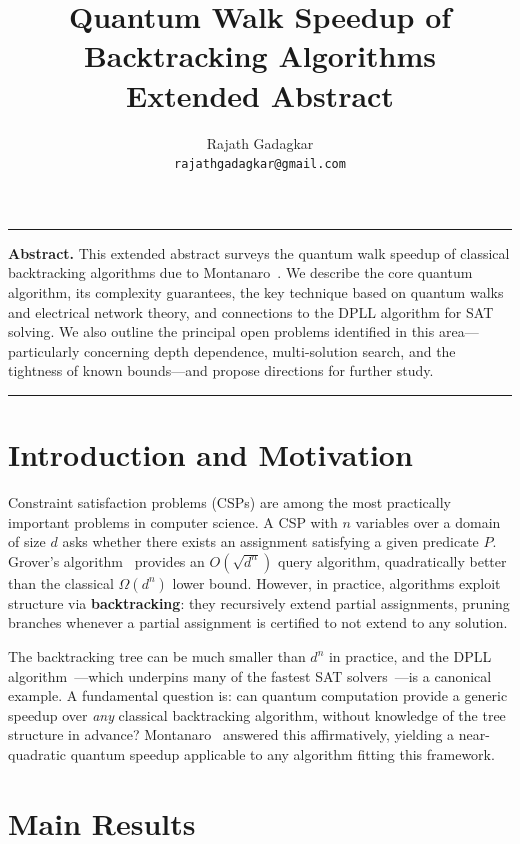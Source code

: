 \documentclass[11pt,a4paper]{article}
\title{\textbf{Quantum Walk Speedup of Backtracking Algorithms}\\[0.3em]
\large Extended Abstract}
\author{Rajath Gadagkar\\\texttt{rajathgadagkar@gmail.com}}
\date{}
\begin{document}
\maketitle
\vspace{-1em}
\hrule
\vspace{0.8em}

\noindent\textbf{Abstract.} This extended abstract surveys the quantum walk speedup of classical backtracking algorithms due to Montanaro~\cite{montanaro2015}. We describe the core quantum algorithm, its complexity guarantees, the key technique based on quantum walks and electrical network theory, and connections to the DPLL algorithm for SAT solving. We also outline the principal open problems identified in this area---particularly concerning depth dependence, multi-solution search, and the tightness of known bounds---and propose directions for further study.

\vspace{0.5em}
\hrule

\section{Introduction and Motivation}

Constraint satisfaction problems (CSPs) are among the most practically important problems in computer science. A CSP with $n$ variables over a domain of size $d$ asks whether there exists an assignment satisfying a given predicate $P$. Grover's algorithm~\cite{grover1997} provides an $O(\sqrt{d^n})$ query algorithm, quadratically better than the classical $\Omega(d^n)$ lower bound. However, in practice, algorithms exploit structure via \textbf{backtracking}: they recursively extend partial assignments, pruning branches whenever a partial assignment is certified to not extend to any solution.

The backtracking tree can be much smaller than $d^n$ in practice, and the DPLL algorithm~\cite{davis1960,davis1962}---which underpins many of the fastest SAT solvers~\cite{een2003,lynce2003}---is a canonical example. A fundamental question is: can quantum computation provide a generic speedup over \emph{any} classical backtracking algorithm, without knowledge of the tree structure in advance? Montanaro~\cite{montanaro2015} answered this affirmatively, yielding a near-quadratic quantum speedup applicable to any algorithm fitting this framework.

\section{Main Results}
\end{document}
